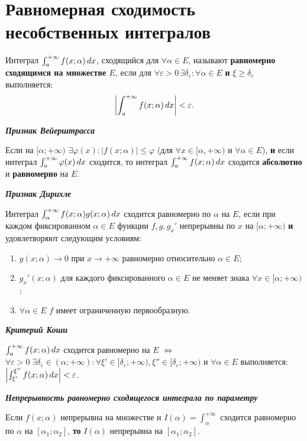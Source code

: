 \section*{Равномерная сходимость несобственных интегралов}

\begin{to_def}
	Интеграл $\int_a^{+ \infty}f(x;\alpha) \, d x$, сходящийся для $\forall \alpha \in E$, называют \textbf{равномерно сходящимся на множестве $E$}, если для $\forall \varepsilon > 0 \, \exists \delta_\varepsilon: \forall \alpha \in E$ \textbf{и} $\xi \geq \delta_\varepsilon$ выполняется:
	$$\left|\int_a^{+\infty} f(x; \alpha)\, d x \right| < \varepsilon.$$
\end{to_def}

\noindent \textbf{\textit{Признак Вейерштрасса}}

Если на $[\alpha; +\infty)$ $\exists \varphi(x): |f(x;\alpha)|\leq \varphi$ (для $\forall x \in [\alpha, +\infty)$ и $\forall \alpha \in E$), \textbf{и}
если интеграл $\int_a^{+\infty} \varphi (x) \, d x$ сходится, то интеграл $\int_a^{+ \infty}f(x;\alpha) \, d x$ сходится \textbf{абсолютно} и \textbf{равномерно} на $E$.

\phantom{239}


\noindent 
\textbf{\textit{Признак Дирихле}}

 Интеграл $\int_\alpha^{+\infty} f(x; \alpha) g(x; \alpha) \, d x$ сходится равномерно по $\alpha$ на $E$, если при каждом фиксированном $\alpha \in E$ функции $f, g, g_x'$ непрерывны по $x$ на $[\alpha; +\infty)$ \textbf{и} удовлетворяют следующим условиям:
 \begin{enumerate}
 	\item $g(x;\alpha) \to 0$ при $x \to + \infty$ равномерно относительно $\alpha \in E$;
 	\item $g_x'(x; \alpha)$ для каждого фиксированного $\alpha \in E$ не меняет знака  $\forall x \in  [\alpha; +\infty)$;
 	\item $\forall \alpha \in E$ $f$ имеет ограниченную первообразную.
 \end{enumerate}


\noindent \textbf{\textit{Критерий Коши}}

$\int_a^{+ \infty}f(x;\alpha) \, d x$ сходится равномерно на $E$ $\Longleftrightarrow$ $\forall \varepsilon > 0 \; \exists \delta_\varepsilon \in (\alpha; + \infty): \forall \xi' \in [\delta_\varepsilon; + \infty), \xi'' \in [\delta_\varepsilon; +\infty)$ и $\forall \alpha \in E$ выполняется: $\left| \int_{\xi'}^{\xi''}f(x;\alpha)\, d x \right| < \varepsilon$.


\phantom{239}

\noindent \textbf{\textit{Непрерывность равномерно сходящегося интеграла по параметру}}

Если $f(x;\alpha)$ непрерывна на множестве и $I(\alpha) = \int_\alpha^{+ \infty}$ сходится равномерно по $\alpha$ на $[\alpha_1; \alpha_2]$, \textbf{то} $I(\alpha)$ непрерывна на $[\alpha_1; \alpha_2]$.